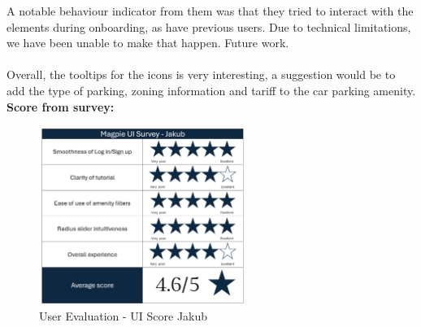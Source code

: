 A notable behaviour indicator from them was that they tried to interact with the elements during onboarding, as have previous users. Due to technical limitations, we have been unable to make that happen. Future work.\\ \\
Overall, the tooltips for the icons is very interesting, a suggestion would be to add the type of parking, zoning information and tariff to the car parking amenity.
\newpage
\textbf{Score from survey: }
\begin{figure}[h!]
    \centering
    \includegraphics[width=0.6\textwidth]{images/survey-jakub.png}
    \caption{User Evaluation - UI Score Jakub}
\end{figure}\\

